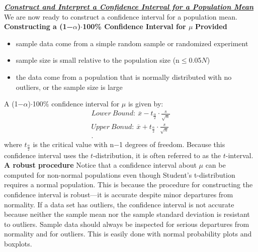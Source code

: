 \documentclass{report}
\begin{document}
    \pagebreak \bigbreak \noindent 
    \textbf{\textit{\underline{Construct and Interpret a Confidence Interval for a Population Mean}}}
    \bigbreak \noindent 
    We are now ready to construct a confidence interval for a population mean.
    \bigbreak \noindent 
    \textbf{Constructing a (1−$\alpha $)$\cdot $100\% Confidence Interval for $\mu$}
    \bigbreak \noindent 
    \textbf{Provided}
    \begin{itemize}
        \item sample data come from a simple random sample or randomized experiment
        \item sample size is small relative to the population size (n$\leq$0.05$N$)
        \item the data come from a population that is normally distributed with no outliers, or the sample size is large
    \end{itemize}
    \bigbreak \noindent 
    A (1−$\alpha$)$ \cdot  $100\% confidence interval for $\mu $ is given by:
    \begin{align*}
        Lower\ Bound:\ \overline{x} - t_{\frac{\alpha}{2}}\cdot \frac{s}{\sqrt{n}} \\
        Upper\ Bonud:\ \overline{x} + t_{\frac{\alpha}{2}}\cdot \frac{s}{\sqrt{n}} \\
    .\end{align*}
    \bigbreak \noindent 
    where $t_{\frac{\alpha}{2}} $ is the critical value with n−1 degrees of freedom.
    \bigbreak \noindent 
    Because this confidence interval uses the $t $-distribution, it is often referred to as the $t$-interval.
    \bigbreak \noindent 
    \bigbreak \noindent 
    \textbf{A robust procedure}
    \bigbreak \noindent 
    Notice that a confidence interval about $\mu $ can be computed for non-normal populations even though Student’s t-distribution requires a normal population. This is because the procedure for constructing the confidence interval is robust—it is accurate despite minor departures from normality.
    \bigbreak \noindent 
    If a data set has outliers, the confidence interval is not accurate because neither the sample mean nor the sample standard deviation is resistant to outliers. Sample data should always be inspected for serious departures from normality and for outliers. This is easily done with normal probability plots and boxplots.
    \pagebreak \bigbreak \noindent 
\end{document}
